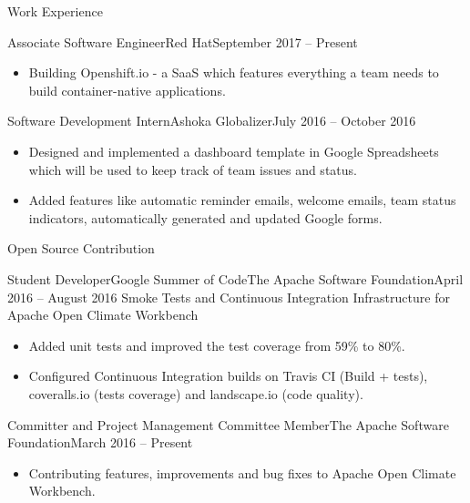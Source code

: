 \documentclass[]{mcdowellcv}
\begin{document}
	\makeheader
	\begin{cvsection}{Work Experience}
		\begin{cvsubsection}{Associate Software Engineer}{Red Hat}{September 2017 -- Present}
			\begin{itemize}
				\item Building Openshift.io - a SaaS which features everything a team needs to build container-native applications.
			\end{itemize}
		\end{cvsubsection}
		\begin{cvsubsection}{Software Development Intern}{Ashoka Globalizer}{July 2016 -- October 2016}
			\begin{itemize}
				\item Designed and implemented a dashboard template in Google Spreadsheets which will be used to keep track of team issues and status.
				\item Added features like automatic reminder emails, welcome emails, team status indicators, automatically generated and updated Google forms.
			\end{itemize}
		\end{cvsubsection}
	\end{cvsection}
	\begin{cvsection}{Open Source Contribution}
		\begin{cvsubsection}[2]{Student Developer\linebreak Google Summer of Code}{The Apache Software Foundation}{April 2016 -- August 2016}
			Smoke Tests and Continuous Integration Infrastructure for Apache Open Climate Workbench
			\begin{itemize}
				\item Added unit tests and improved the test coverage from 59\% to 80\%.
				\item Configured Continuous Integration builds on Travis CI (Build + tests), coveralls.io (tests coverage) and landscape.io (code quality).
			\end{itemize}
		\end{cvsubsection}
		\begin{cvsubsection}[2]{Committer and Project Management Committee Member}{The Apache Software Foundation}{March 2016 -- Present}
			\begin{itemize}
				\item Contributing features, improvements and bug fixes to Apache Open Climate Workbench.
			\end{itemize}
		\end{cvsubsection}
	\end{cvsection}
\end{document}
